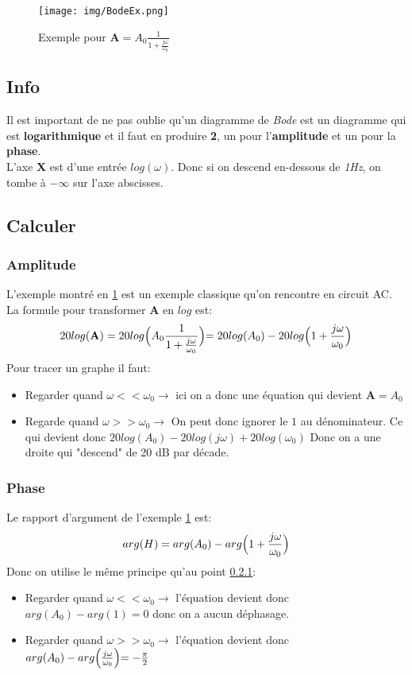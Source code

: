 \documentclass{report}
\begin{document}
\begin{figure}[H]
\centering
\texttt{[image: img/BodeEx.png]}
\caption{Exemple pour $\textbf{A} = A_0 \frac{1}{1 + \frac{j \omega}{\omega_0}}$} \label{BodeEx}
\end{figure}

\subsection{Info}
Il est important de ne pas oublie qu'un diagramme de \textit{Bode} est un diagramme qui est \textbf{logarithmique} et il faut en produire \textbf{2}, un pour l'\textbf{amplitude} et un pour la \textbf{phase}.\\

L'axe \textbf{X} est d'une entrée $log(\omega)$. Donc si on descend en-dessous de \textit{1Hz}, on tombe à $-\infty$ sur l'axe abscisses.

\subsection{Calculer}
\subsubsection{Amplitude} \label{AmplCalc}
L'exemple montré en \ref{BodeEx} est un exemple classique qu'on rencontre en circuit AC. La formule pour transformer \textbf{A} en $log$ est:
\begin{equation}
20log(\textbf{A}) = 20 log\Bigl(A_0\frac{1}{1+\frac{j\omega}{\omega_0}}\Bigl) = 20log(A_0) - 20log\Bigl(1+ \frac{j\omega}{\omega_0}\Bigl)
\end{equation}
Pour tracer un graphe il faut:
\begin{itemize}
\item Regarder quand $\omega < < \omega_0 \rightarrow$ ici on a donc une équation qui devient $\textbf{A} = A_0$
\item Regarde quand  $\omega > > \omega_0 \rightarrow$ On peut donc ignorer le $1$ au dénominateur. Ce qui devient donc $20log(A_0) - 20log(j\omega) + 20 log(\omega_0)$ Donc on a une droite qui "descend" de 20 dB par décade.
\end{itemize}

\subsubsection{Phase}
Le rapport d'argument de l'exemple \ref{BodeEx} est:
\begin{equation}
arg(H) =  arg(A_0) - arg\Bigl(1 + \frac{j\omega}{\omega_0}\Bigl)
\end{equation}
Donc on utilise le même principe qu'au point \ref{AmplCalc}:
\begin{itemize}
\item Regarder quand $\omega < < \omega_0 \rightarrow$ l'équation devient donc $arg(A_0)-arg(1) = 0$ donc on a aucun déphasage.
\item Regarder quand $\omega > > \omega_0 \rightarrow$ l'équation devient donc $arg(A_0) -arg\Bigl(\frac{j\omega}{\omega_0}\Bigl) = -\frac{\pi}{2}$
\end{itemize}
\end{document}
